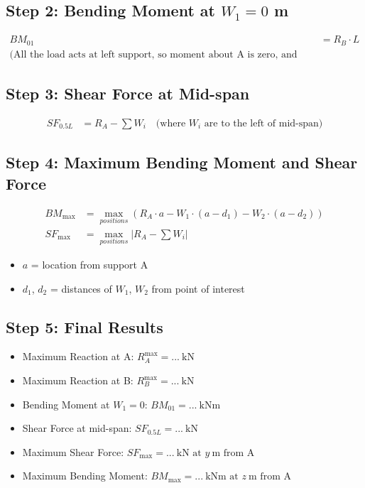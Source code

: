 \documentclass[12pt,a4paper]{article}
\begin{document}
\subsection*{Step 2: Bending Moment at $W_1 = 0$ m}
\begin{align*}
BM_{01} &= R_B \cdot L \\
\text{(All the load acts at left support, so moment about A is zero, and max at B)}
\end{align*}

\subsection*{Step 3: Shear Force at Mid-span}
\begin{align*}
SF_{0.5L} &= R_A - \sum W_i \quad \text{(where $W_i$ are to the left of mid-span)}
\end{align*}

\subsection*{Step 4: Maximum Bending Moment and Shear Force}
\begin{align*}
BM_{\max} &= \max_{positions} \left( R_A \cdot a - W_1 \cdot (a - d_1) - W_2 \cdot (a - d_2) \right) \\
SF_{\max} &= \max_{positions} \left| R_A - \sum W_i \right|
\end{align*}
\begin{itemize}
    \item $a$ = location from support A
    \item $d_1$, $d_2$ = distances of $W_1$, $W_2$ from point of interest
\end{itemize}

\subsection*{Step 5: Final Results}
\begin{itemize}
    \item Maximum Reaction at A: $\boxed{R_A^{\max} = \textbf{...}~\text{kN}}$
    \item Maximum Reaction at B: $\boxed{R_B^{\max} = \textbf{...}~\text{kN}}$
    \item Bending Moment at $W_1 = 0$: $\boxed{BM_{01} = \textbf{...}~\text{kNm}}$
    \item Shear Force at mid-span: $\boxed{SF_{0.5L} = \textbf{...}~\text{kN}}$
    \item Maximum Shear Force: $\boxed{SF_{\max} = \textbf{...}~\text{kN at } y~\text{m from A}}$
    \item Maximum Bending Moment: $\boxed{BM_{\max} = \textbf{...}~\text{kNm at } z~\text{m from A}}$
\end{itemize}
\end{document}
